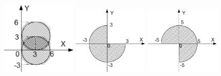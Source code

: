 \begin{figure}[h]%
\begin{floatrow}[3]
{\includegraphics[width=0.32\textwidth,keepaspectratio]{img/ris_3_76}}
{\includegraphics[width=0.32\textwidth,keepaspectratio]{img/ris_3_77}}
{\includegraphics[width=0.32\textwidth,keepaspectratio]{img/ris_3_78}}
\end{floatrow}
\end{figure}%

